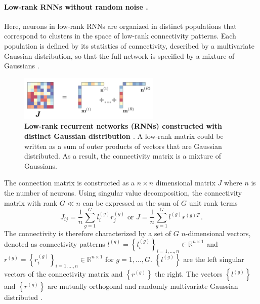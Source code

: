 \documentclass[11pt]{article}
\begin{document}
{	\paragraph{Low-rank RNNs without random noise \cite{beiran2021shaping, dubreuil2022role}.}
	Here, neurons in low-rank RNNs are organized in distinct populations that correspond to clusters in the space of low-rank connectivity patterns. Each population is defined by its statistics of connectivity, described by a multivariate Gaussian distribution, so that the full network is specified by a mixture of Gaussians \cite{beiran2021shaping}.
		\vspace{-0.5cm}
		\begin{figure}[H]
			\centering
			\includegraphics[width=0.6\textwidth]{../figures/low_rank_RNN_without_noise.jpg}
			\caption{\textbf{Low-rank recurrent networks (RNNs) constructed with distinct Gaussian distribution \cite{beiran2023parametric}}. A low-rank matrix could be written as a sum of outer products of vectors that are Gaussian distributed. As a result, the connectivity matrix is a mixture of Gaussians. }
			\label{fig:low_rank_RNN_without_noise}
		\end{figure}
	The connection matrix is constructed as a $n \times n$ dimensional matrix $J$ where $n$ is the number of neurons. Using singular value decomposition, the connectivity matrix with rank $G \ll n$ can be expressed as the sum of $G$ unit rank terms
		\begin{equation} \label{eq:low_rank_RNN_without_noise}
			J_{ij} = \frac{1}{n}\sum_{g = 1}^{G} l_i^{(g)}r_j^{(g)} \, \, \text{or} \, \, J = \frac{1}{n} \sum_{g=1}^{G} l^{(g)} r^{(g)T} \, . 
		\end{equation}
	The connectivity is therefore characterized by a set of $G$ $n$-dimensional vectors, denoted as connectivity patterns $l^{(g)} = \left\{l_i^{(g)}\right\}_{i = 1, ..., n } \in \mathbb{R}^{n \times 1}$ and $r^{(g)} = \left\{r_i^{(g)}\right\}_{i = 1, ..., n } \in \mathbb{R}^{n \times 1}$ for $g = 1, ..., G$. $\left\{l^{(g)}\right\}$ are the left singular vectors of the connectivity matrix and $\left\{r^{(g)}\right\}$ the right. The vectors $\left\{l^{(g)}\right\}$ and $\left\{r^{(g)}\right\}$ are mutually orthogonal and randomly multivariate Gaussian distributed \cite{beiran2021shaping}. 
	
}
\end{document}
